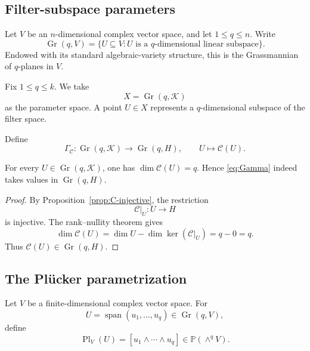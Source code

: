 \documentclass{siamonline250211}
\newcommand{\PP}{\mathbb P}
\newcommand{\Gr}{\operatorname{Gr}}
\newcommand{\Pl}{\operatorname{Pl}}
\newcommand{\Span}{\operatorname{span}}
\newcommand{\cK}{\mathcal K}
\newcommand{\cC}{\mathcal C}
\begin{document}
\subsection{Filter-subspace parameters}

\begin{definition}[Grassmannian]\label{def:grassmannian}
Let $V$ be an $n$-dimensional complex vector space, and let $1\leq q\leq n$.
Write
\[
  \Gr(q,V)=\{U\subseteq V: U\text{ is a }q\text{-dimensional linear subspace}\}.
\]
Endowed with its standard algebraic-variety structure, this is the Grassmannian
of $q$-planes in $V$.
\end{definition}

Fix $1\leq q\leq k$. We take
\[
  X=\Gr(q,\cK)
\]
as the parameter space. A point $U\in X$ represents a $q$-dimensional subspace
of the filter space.

\begin{definition}\label{def:Gamma}
Define
\begin{equation}\label{eq:Gamma}
  \Gamma_{\cC}:\Gr(q,\cK)\longrightarrow\Gr(q,H),
  \qquad U\longmapsto\cC(U).
\end{equation}
\end{definition}

\begin{lemma}[Well-definedness of $\Gamma_{\cC}$]
\label{lem:Gamma-well-defined}
For every $U\in\Gr(q,\cK)$, one has $\dim\cC(U)=q$. Hence
\eqref{eq:Gamma} indeed takes values in $\Gr(q,H)$.
\end{lemma}

\begin{proof}
By Proposition~\ref{prop:C-injective}, the restriction
\[
  \cC|_U:U\longrightarrow H
\]
is injective. The rank--nullity theorem gives
\[
  \dim\cC(U)
  =\dim U-\dim\ker(\cC|_U)
  =q-0=q.
\]
Thus $\cC(U)\in\Gr(q,H)$.
\end{proof}

\subsection{The Pl\texorpdfstring{\"u}{u}cker parametrization}

\begin{definition}\label{def:Plucker}
Let $V$ be a finite-dimensional complex vector space. For
\[
  U=\Span(u_1,\ldots,u_q)\in\Gr(q,V),
\]
define
\begin{equation}\label{eq:Plucker}
  \Pl_V(U)=[u_1\wedge\cdots\wedge u_q]
  \in\PP(\wedge^qV).
\end{equation}
\end{definition}
\end{document}
